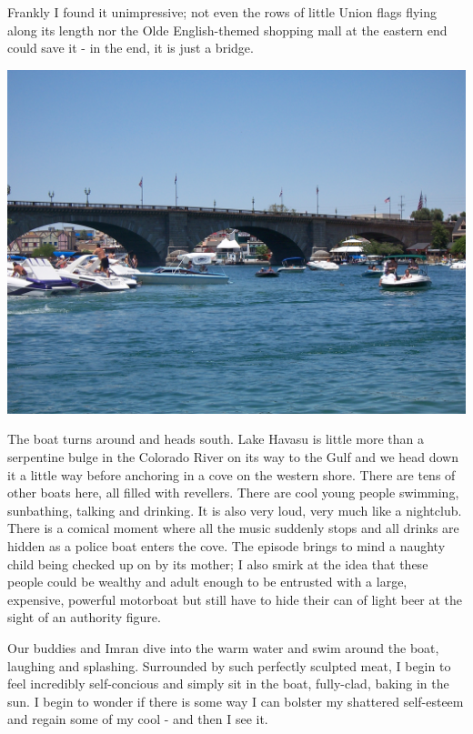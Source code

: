 \documentclass[a5paper,titlepage,11pt]{book}
\begin{document}
Frankly I found it unimpressive; not even the rows of little Union flags flying along its length nor the Olde English-themed shopping mall at the eastern end could save it - in the end, it is just a bridge.

\begin{center}\includegraphics[width=\textwidth]{gfx/100_1598}\end{center}

The boat turns around and heads south.  Lake Havasu is little more than a serpentine bulge in the Colorado River on its way to the Gulf and we head down it a little way before anchoring in a cove on the western shore.  There are tens of other boats here, all filled with revellers.  There are cool young people swimming, sunbathing, talking and drinking.  It is also very loud, very much like a nightclub.  There is a comical moment where all the music suddenly stops and all drinks are hidden as a police boat enters the cove.  The episode brings to mind a naughty child being checked up on by its mother; I also smirk at the idea that these people could be wealthy and adult enough to be entrusted with a large, expensive, powerful motorboat but still have to hide their can of light beer at the sight of an authority figure.

Our buddies and Imran dive into the warm water and swim around the boat, laughing and splashing.  Surrounded by such perfectly sculpted meat, I begin to feel incredibly self-concious and simply sit in the boat, fully-clad, baking in the sun.  I begin to wonder if there is some way I can bolster my shattered self-esteem and regain some of my cool - and then I see it.
\end{document}
